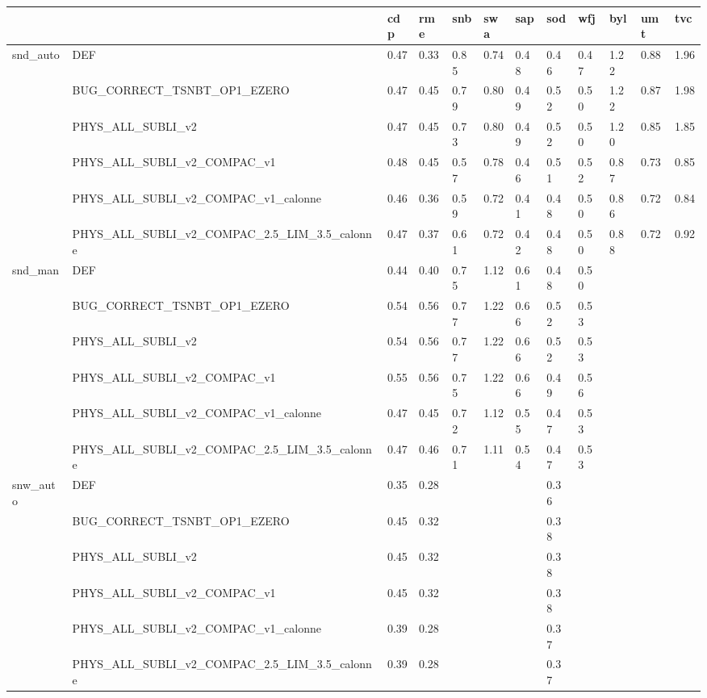 \begin{tabular}{llllllllllll}
\toprule
 &  & cdp & rme & snb & swa & sap & sod & wfj & byl & umt & tvc \\
\midrule
\multirow[t]{6}{*}{snd_auto} & DEF & 0.47 & 0.33 & 0.85 & 0.74 & 0.48 & 0.46 & 0.47 & 1.22 & 0.88 & 1.96 \\
 & BUG_CORRECT_TSNBT_OP1_EZERO & 0.47 & 0.45 & 0.79 & 0.80 & 0.49 & 0.52 & 0.50 & 1.22 & 0.87 & 1.98 \\
 & PHYS_ALL_SUBLI_v2 & 0.47 & 0.45 & 0.73 & 0.80 & 0.49 & 0.52 & 0.50 & 1.20 & 0.85 & 1.85 \\
 & PHYS_ALL_SUBLI_v2_COMPAC_v1 & 0.48 & 0.45 & 0.57 & 0.78 & 0.46 & 0.51 & 0.52 & 0.87 & 0.73 & 0.85 \\
 & PHYS_ALL_SUBLI_v2_COMPAC_v1_calonne & 0.46 & 0.36 & 0.59 & 0.72 & 0.41 & 0.48 & 0.50 & 0.86 & 0.72 & 0.84 \\
 & PHYS_ALL_SUBLI_v2_COMPAC_2.5_LIM_3.5_calonne & 0.47 & 0.37 & 0.61 & 0.72 & 0.42 & 0.48 & 0.50 & 0.88 & 0.72 & 0.92 \\
\cline{1-12}
\multirow[t]{6}{*}{snd_man} & DEF & 0.44 & 0.40 & 0.75 & 1.12 & 0.61 & 0.48 & 0.50 &  &  &  \\
 & BUG_CORRECT_TSNBT_OP1_EZERO & 0.54 & 0.56 & 0.77 & 1.22 & 0.66 & 0.52 & 0.53 &  &  &  \\
 & PHYS_ALL_SUBLI_v2 & 0.54 & 0.56 & 0.77 & 1.22 & 0.66 & 0.52 & 0.53 &  &  &  \\
 & PHYS_ALL_SUBLI_v2_COMPAC_v1 & 0.55 & 0.56 & 0.75 & 1.22 & 0.66 & 0.49 & 0.56 &  &  &  \\
 & PHYS_ALL_SUBLI_v2_COMPAC_v1_calonne & 0.47 & 0.45 & 0.72 & 1.12 & 0.55 & 0.47 & 0.53 &  &  &  \\
 & PHYS_ALL_SUBLI_v2_COMPAC_2.5_LIM_3.5_calonne & 0.47 & 0.46 & 0.71 & 1.11 & 0.54 & 0.47 & 0.53 &  &  &  \\
\cline{1-12}
\multirow[t]{6}{*}{snw_auto} & DEF & 0.35 & 0.28 &  &  &  & 0.36 &  &  &  &  \\
 & BUG_CORRECT_TSNBT_OP1_EZERO & 0.45 & 0.32 &  &  &  & 0.38 &  &  &  &  \\
 & PHYS_ALL_SUBLI_v2 & 0.45 & 0.32 &  &  &  & 0.38 &  &  &  &  \\
 & PHYS_ALL_SUBLI_v2_COMPAC_v1 & 0.45 & 0.32 &  &  &  & 0.38 &  &  &  &  \\
 & PHYS_ALL_SUBLI_v2_COMPAC_v1_calonne & 0.39 & 0.28 &  &  &  & 0.37 &  &  &  &  \\
 & PHYS_ALL_SUBLI_v2_COMPAC_2.5_LIM_3.5_calonne & 0.39 & 0.28 &  &  &  & 0.37 &  &  &  &  \\

\end{tabular}
